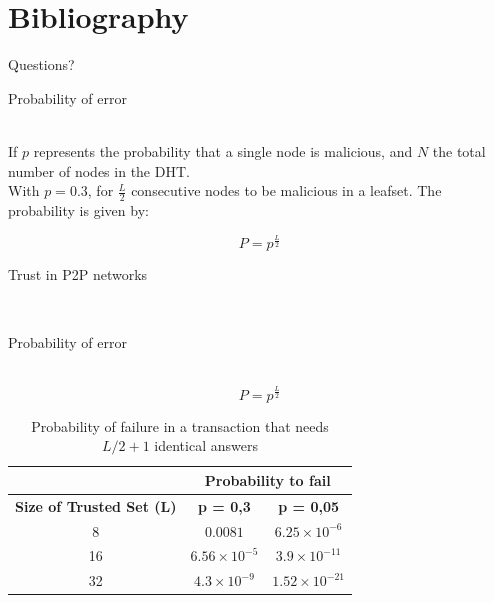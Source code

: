 \documentclass[12pt]{beamer}
\renewcommand{\frametitle}[1]{\vspace{0.2cm}\begin{huge}#1\end{huge}\\}
\renewcommand{\framesubtitle}[1]{\vspace{0.4cm} \hspace{0.4cm}\begin{large}#1\end{large}\\}
\begin{document}
  \section{Bibliography}
\frame
{
	\vspace{2cm}
	\begin{center}
		\Large{Questions?}
	\end{center}
}

  \begin{frame}
  \frametitle{Probability of error}

      If $p$ represents the probability that a single node is malicious, and
      $N$ the total number of nodes in the DHT.\\

      With $p= 0.3$, for   
      $\frac{L}{2}$ consecutive nodes to be malicious in a leafset. The
probability is given by:

  \begin{equation} \label{eq:p_leafset}
    P= p^{\frac{L}{2}}
  \end{equation}

  \end{frame}

  \begin{frame}
  \frametitle{Trust in P2P networks}
  \framesubtitle{Probability of error}

  \begin{equation} \label{eq:p_leafset}
    P= p^{\frac{L}{2}}
  \end{equation}

  \begin{table}
    \centering
    \footnotesize
    \begin{tabular}{|c|c|c|}
      \cline{2-3}
      \multicolumn{1}{c|}{}&  \multicolumn{2}{c|}{\textbf{Probability to fail}} \\ \cline{2-3}
      \hline
      \textbf{Size of Trusted Set (L)} & \textbf{p = 0,3} & \textbf{p = 0,05} \\
      \hline \hline
      8 &  $0.0081$              & $6.25 \times 10^{-6}$  \\
      \hline
      16 & $6.56 \times 10^{-5}$ & $ 3.9 \times 10^{-11}$ \\
      \hline
      32 & $4.3 \times 10^{-9}$  & $ 1.52 \times 10^{-21} $  \\
      \hline
    \end{tabular}
    \caption{Probability of failure in a transaction that needs $L/2+1$
identical answers}
    \label{tab:p_leafset}
  \end{table}

  \end{frame}
  
\end{document}
